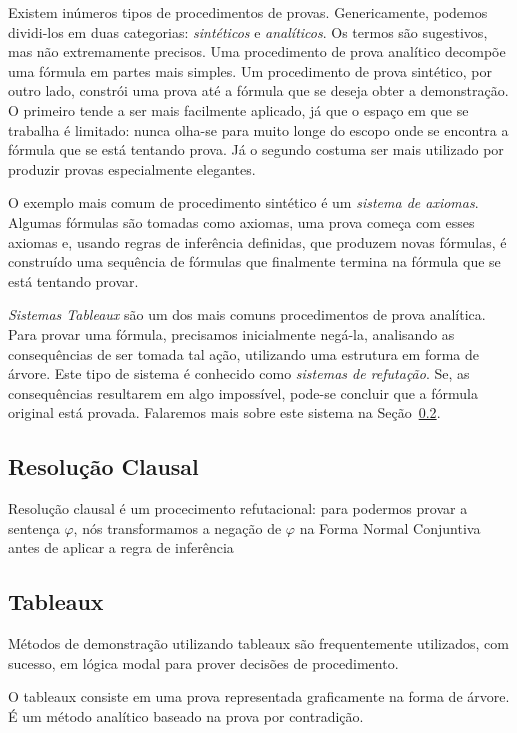 Existem inúmeros tipos de procedimentos de provas. Genericamente, podemos
dividi-los em duas categorias: \textit{sintéticos} e \textit{analíticos}. Os
termos são sugestivos, mas não extremamente precisos. Uma procedimento de prova
analítico decompõe uma fórmula em partes mais simples. Um procedimento de prova
sintético, por outro lado, constrói uma prova até a fórmula que se deseja obter a
demonstração.
O primeiro tende a ser mais facilmente aplicado, já que o espaço em que se
trabalha é limitado: nunca olha-se para muito longe do escopo onde se encontra a
fórmula que se está tentando prova. Já o segundo costuma ser mais utilizado por
produzir provas especialmente elegantes.

O exemplo mais comum de procedimento sintético é um \textit{sistema de axiomas}.
Algumas fórmulas são tomadas como axiomas, uma prova começa com esses axiomas e,
usando regras de inferência definidas, que produzem novas fórmulas, é construído
uma sequência de fórmulas que finalmente termina na fórmula que se está tentando
provar.

\textit{Sistemas Tableaux} são um dos mais comuns procedimentos de prova
analítica. Para provar uma fórmula, precisamos inicialmente negá-la, analisando
as consequências de ser tomada tal ação, utilizando uma estrutura em forma de
árvore. Este tipo de sistema é conhecido como \textit{sistemas de refutação}.
Se, as consequências resultarem em algo impossível, pode-se concluir que a
fórmula original está provada. Falaremos mais sobre este sistema na
Seção~\ref{sub:tableaux}.


\subsection{Resolução Clausal}
Resolução clausal é um procecimento refutacional: para podermos provar a
sentença $\varphi$, nós transformamos a negação de $\varphi$ na Forma Normal
Conjuntiva antes de aplicar a regra de inferência

\subsection{Tableaux}
\label{sub:tableaux}
Métodos de demonstração utilizando tableaux são frequentemente utilizados,
com sucesso, em lógica modal para prover decisões de procedimento.

O tableaux consiste em uma prova representada graficamente na forma de árvore. É
um método analítico baseado na prova por contradição.

